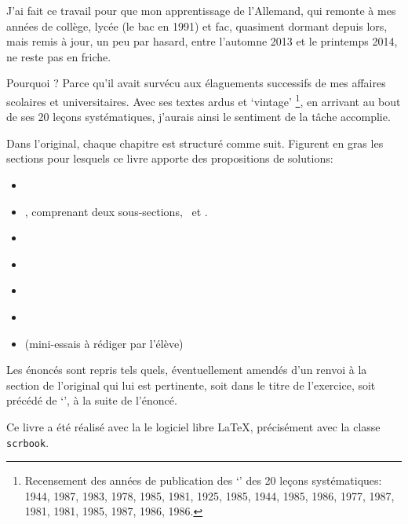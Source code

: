\documentclass[
  12pt]
{scrbook}%
\renewcommand\ExerciseName{Exercice}
\begin{document}
J'ai fait ce travail pour que mon apprentissage de l'Allemand, qui remonte \`a mes ann\'ees de coll\`ege, lyc\'ee (le bac en 1991) et fac, quasiment dormant depuis lors, mais remis \`a jour, un peu par hasard, entre l'automne 2013 et le printemps 2014, ne reste pas en friche. 

Pourquoi \emph{\ldaTTL}? Parce qu'il avait surv\'ecu aux \'elaguements successifs de mes affaires scolaires et universitaires. Avec ses textes ardus et `vintage' \footnote{Recensement des ann\'ees de publication des `\ldaTXT' des 20 le\c cons syst\'ematiques: 1944, 1987, 1983, 1978, 1985, 1981,  1925, 1985, 1944, 1985, 1986, 1977, 1987, 1981, 1981, 1985, 1987, 1986, 1986.}, en arrivant au bout de ses 20 le\c cons syst\'ematiques, j'aurais ainsi le sentiment de la t\^ache accomplie. 

Dans l'original, chaque chapitre est structur\'e comme suit. Figurent en gras les sections pour lesquels ce livre apporte des propositions de solutions: 
\begin{itemize}
\item \ldaTXT
\item \ldaLEX, comprenant deux sous-sections, \ldaLEXa~et \ldaLEXb. 
\item \ldaGRAM
\item \textbf{\ldaEXs}
\item \ldaLEXc
\item \textbf{}
\item {} (mini-essais \`a r\'ediger par l'\'el\`eve)
\end{itemize}

Les \'enonc\'es sont repris tels quels, \'eventuellement amend\'es d'un renvoi \`a la section de l'original qui lui est pertinente, soit dans le titre de l'exercice, soit pr\'ec\'ed\'e de `\ldaINDIC', \`a la suite de l'\'enonc\'e. 

Ce livre a \'et\'e r\'ealis\'e avec la le logiciel libre \LaTeX, pr\'ecis\'ement avec la classe \texttt{scrbook}.

%
%
%



\tableofcontents


\end{document}
